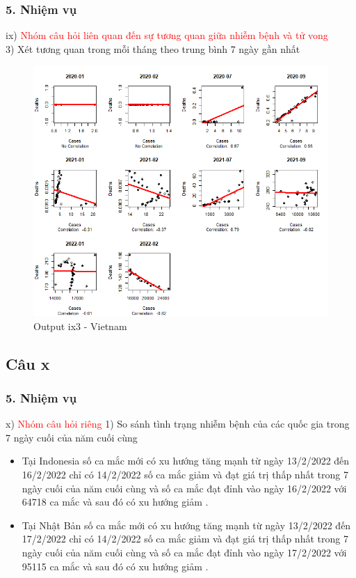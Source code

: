 \documentclass[english,10pt,table]{beamer}
\begin{document}
\begin{frame}[fragile]
\frametitle{5.  Nhiệm vụ}
ix) \textcolor{red}{Nhóm câu hỏi liên quan đến sự tương quan giữa nhiễm bệnh và tử vong}\\
3) Xét tương quan trong mỗi tháng theo trung bình 7 ngày gần nhất
	\begin{figure}[h!]
	\begin{center}
		    \includegraphics[scale = 0.36]{Images/IX/Vietnam (avg7).png}
		     \caption{Output ix3 - Vietnam}
		\end{center}
		\end{figure}
\end{frame}

\subsection{Câu x}
\begin{frame}[fragile]
\frametitle{5.  Nhiệm vụ}
x) \textcolor{red}{Nhóm câu hỏi riêng}
        1) So sánh tình trạng nhiễm bệnh của các quốc gia trong 7 ngày cuối của năm cuối cùng
\begin{itemize}
	\item  Tại Indonesia số ca mắc mới có xu hướng tăng mạnh từ ngày 13/2/2022 đến 16/2/2022 chỉ có 14/2/2022 số ca mắc giảm và đạt giá trị thấp nhất trong 7 ngày cuối của năm cuối cùng và số ca mắc đạt đỉnh vào ngày 16/2/2022 với 64718 ca mắc và sau đó có xu hướng giảm .
   \item Tại Nhật Bản  số ca mắc mới có xu hướng tăng mạnh từ ngày 13/2/2022 đến 17/2/2022 chỉ có 14/2/2022 số ca mắc giảm và đạt giá trị thấp nhất trong 7 ngày cuối của năm cuối cùng và số ca mắc đạt đỉnh vào ngày 17/2/2022 với 95115 ca mắc và sau đó có xu hướng giảm .
	\end{itemize}
\end{frame}
\end{document}
